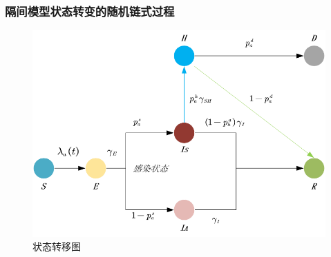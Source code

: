 \documentclass[bwprint]{gmcmthesis}
\numberwithin{figure}{section}
\begin{document}
\subsubsection{隔间模型状态转变的随机链式过程}
\begin{figure}[!h]
\centering
\includegraphics[width=.75\textwidth]{seirhd.png}
\caption{状态转移图}
\label{SLIRS}
\end{figure}
\end{document}
